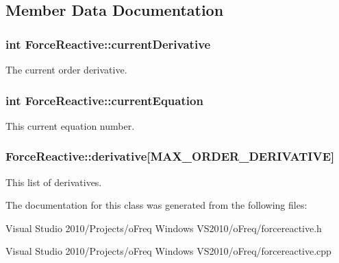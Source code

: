 \subsection{Member Data Documentation}
\hypertarget{class_force_reactive_a6c4302050614499c9ffeda4ad21928ec}{
\subsubsection[{current\-Derivative}]{\setlength{\rightskip}{0pt plus 5cm}int Force\-Reactive\-::current\-Derivative\hspace{0.3cm}{\ttfamily [protected]}}}\label{class_force_reactive_a6c4302050614499c9ffeda4ad21928ec}
The current order derivative. \hypertarget{class_force_reactive_a9aa1f30d63006bc56be33830da1d8331}{
\subsubsection[{current\-Equation}]{\setlength{\rightskip}{0pt plus 5cm}int Force\-Reactive\-::current\-Equation\hspace{0.3cm}{\ttfamily [protected]}}}\label{class_force_reactive_a9aa1f30d63006bc56be33830da1d8331}
This current equation number. \hypertarget{class_force_reactive_ad0da544a781cfac29d317e8c59e9f3f0}{
\subsubsection[{derivative}]{ Force\-Reactive\-::derivative\mbox{[}M\-A\-X\-\_\-\-O\-R\-D\-E\-R\-\_\-\-D\-E\-R\-I\-V\-A\-T\-I\-V\-E\mbox{]}\hspace{0.3cm}{\ttfamily [protected]}}}\label{class_force_reactive_ad0da544a781cfac29d317e8c59e9f3f0}
This list of derivatives. 

The documentation for this class was generated from the following files\-:\begin{DoxyCompactItemize}
\item 
Visual Studio 2010/\-Projects/o\-Freq Windows V\-S2010/o\-Freq/forcereactive.\-h\item 
Visual Studio 2010/\-Projects/o\-Freq Windows V\-S2010/o\-Freq/forcereactive.\-cpp\end{DoxyCompactItemize}
